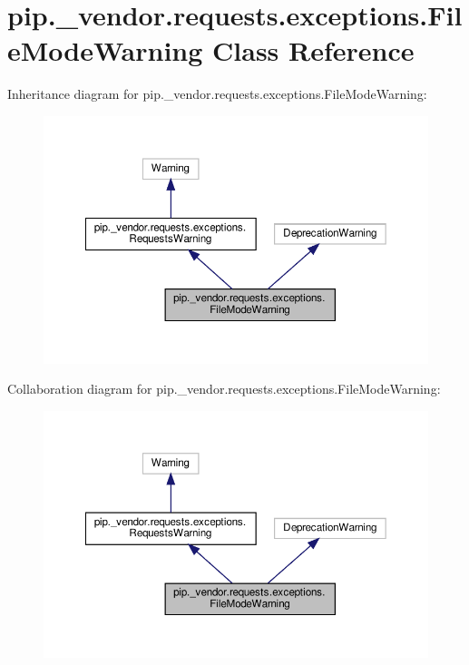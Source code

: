 \hypertarget{classpip_1_1__vendor_1_1requests_1_1exceptions_1_1FileModeWarning}{}\section{pip.\+\_\+vendor.\+requests.\+exceptions.\+File\+Mode\+Warning Class Reference}
\label{classpip_1_1__vendor_1_1requests_1_1exceptions_1_1FileModeWarning}


Inheritance diagram for pip.\+\_\+vendor.\+requests.\+exceptions.\+File\+Mode\+Warning\+:
\nopagebreak
\begin{figure}[H]
\begin{center}
\leavevmode
\includegraphics[width=350pt]{classpip_1_1__vendor_1_1requests_1_1exceptions_1_1FileModeWarning__inherit__graph}
\end{center}
\end{figure}


Collaboration diagram for pip.\+\_\+vendor.\+requests.\+exceptions.\+File\+Mode\+Warning\+:
\nopagebreak
\begin{figure}[H]
\begin{center}
\leavevmode
\includegraphics[width=350pt]{classpip_1_1__vendor_1_1requests_1_1exceptions_1_1FileModeWarning__coll__graph}
\end{center}
\end{figure}


